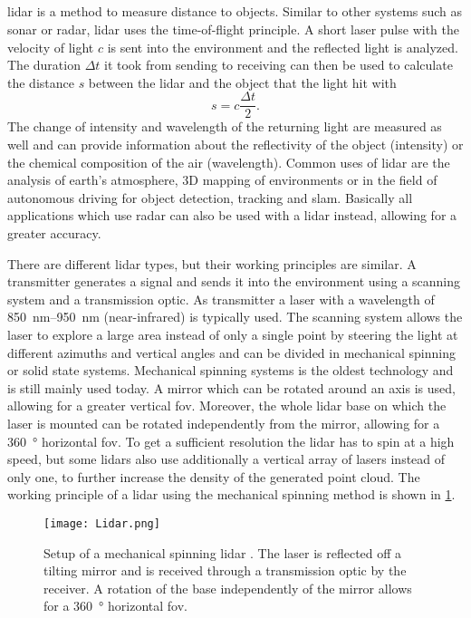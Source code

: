 \subsection{}
\gls{lidar} is a method to measure distance to objects.
Similar to other systems such as \gls{sonar} or \gls{radar}, \gls{lidar} uses the time-of-flight principle.
A short laser pulse with the velocity of light $c$ is sent into the environment and the reflected light is analyzed.
The duration $\Delta t$ it took from sending to receiving can then be used to calculate the distance $s$ between the \gls{lidar} and the object that the light hit with
\begin{equation}
	s = c\frac{\Delta t}{2}.
\end{equation}
The change of intensity and wavelength of the returning light are measured as well and can provide information about the reflectivity of the object (intensity) or the chemical composition of the air (wavelength).
Common uses of \gls{lidar} are the analysis of earth's atmosphere, 3D mapping of environments or in the field of autonomous driving for object detection, tracking and \gls{slam}.
Basically all applications which use \gls{radar} can also be used with a \gls{lidar} instead, allowing for a greater accuracy.\par
There are different \gls{lidar} types, but their working principles are similar.
A transmitter generates a signal and sends it into the environment using a scanning system and a transmission optic.
As transmitter a laser with a wavelength of \SIrange{850}{950}{\nano\metre} (near-infrared) is typically used.
The scanning system allows the laser to explore a large area instead of only a single point by steering the light at different azimuths and vertical angles and can be divided in mechanical spinning or solid state systems.
Mechanical spinning systems is the oldest technology and is still mainly used today.
A mirror which can be rotated around an axis is used, allowing for a greater vertical \gls{fov}.
Moreover, the whole \gls{lidar} base on which the laser is mounted can be rotated independently from the mirror, allowing for a \SI{360}{\degree} horizontal \gls{fov}.
To get a sufficient resolution the \gls{lidar} has to spin at a high speed, but some \glspl{lidar} also use additionally a vertical array of lasers instead of only one, to further increase the density of the generated point cloud.
The working principle of a \gls{lidar} using the mechanical spinning method is shown in \cref{fig:lidar}.
\begin{figure}[htb]
	\centering
	\texttt{[image: Lidar.png]}
	\caption[Setup of a mechanical spinning \acrshort{lidar}]{Setup of a mechanical spinning \acrshort{lidar} \cite{Li2020}. The laser is reflected off a tilting mirror and is received through a transmission optic by the receiver. A rotation of the base independently of the mirror allows for a \SI{360}{\degree} horizontal \gls{fov}.}
	\label{fig:lidar}
\end{figure}
